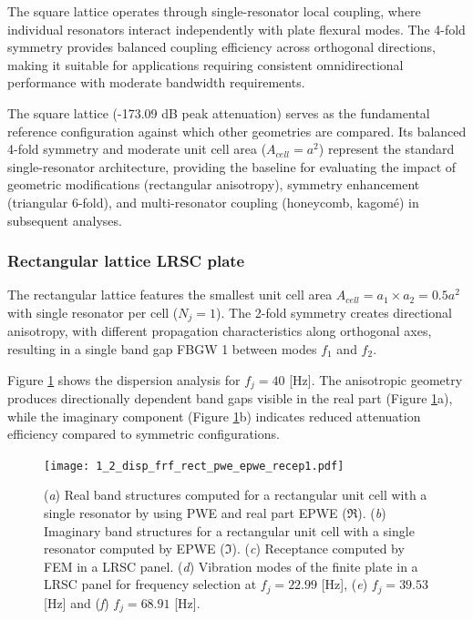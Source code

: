 \documentclass[review,numbers,sort&compress]{elsarticle}
\begin{document}
The square lattice operates through single-resonator local coupling, where individual resonators interact independently with plate flexural modes. The 4-fold symmetry provides balanced coupling efficiency across orthogonal directions, making it suitable for applications requiring consistent omnidirectional performance with moderate bandwidth requirements.

The square lattice (-173.09 dB peak attenuation) serves as the fundamental reference configuration against which other geometries are compared. Its balanced 4-fold symmetry and moderate unit cell area ($A_{cell} = a^2$) represent the standard single-resonator architecture, providing the baseline for evaluating the impact of geometric modifications (rectangular anisotropy), symmetry enhancement (triangular 6-fold), and multi-resonator coupling (honeycomb, kagomé) in subsequent analyses.

\subsubsection{Rectangular lattice LRSC plate}\label{panel_lat_r}

The rectangular lattice features the smallest unit cell area $A_{cell} = a_1 \times a_2 = 0.5a^2$ with single resonator per cell ($N_j = 1$). The 2-fold symmetry creates directional anisotropy, with different propagation characteristics along orthogonal axes, resulting in a single band gap FBGW 1 between modes $f_1$ and $f_2$.

Figure \ref{lat_r_pwe_epwe_tr_frf} shows the dispersion analysis for $f_j = 40$ [Hz]. The anisotropic geometry produces directionally dependent band gaps visible in the real part (Figure \ref{lat_r_pwe_epwe_tr_frf}a), while the imaginary component (Figure \ref{lat_r_pwe_epwe_tr_frf}b) indicates reduced attenuation efficiency compared to symmetric configurations.

\begin{figure}[htb]
	\centering
	\texttt{[image: 1\_2\_disp\_frf\_rect\_pwe\_epwe\_recep1.pdf]}
	\caption{(\textit{a}) Real band structures computed for a rectangular unit cell with a single resonator by using PWE and real part EPWE ($\Re$). (\textit{b}) Imaginary band structures for a rectangular unit cell with a single resonator computed by EPWE ($\Im$). (\textit{c}) Receptance computed by FEM in a LRSC panel. (\textit{d}) Vibration modes of the finite plate in a LRSC panel for frequency selection at $f_j = 22.99$ [Hz], (\textit{e}) $f_j = 39.53$ [Hz] and (\textit{f}) $f_j = 68.91$ [Hz].}
	\label{lat_r_pwe_epwe_tr_frf}
\end{figure}
\end{document}
